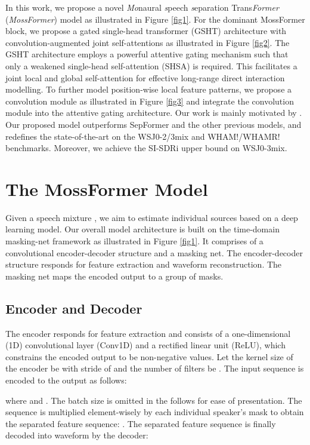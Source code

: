 \documentclass[9pt]{extarticle}
\begin{document}
In this work, we propose a novel \textit{Mo}naural \textit{s}peech \textit{s}eparation Trans\textit{Former} (\textit{MossFormer}) model as illustrated in Figure \ref{fig1}. For the dominant MossFormer block, we propose a gated single-head transformer (GSHT) architecture with convolution-augmented joint self-attentions as illustrated in Figure \ref{fig2}. The GSHT architecture employs a powerful attentive gating mechanism such that only a weakened single-head self-attention (SHSA) is required.  This facilitates a joint local and global self-attention for effective long-range direct interaction modelling. To further model position-wise local feature patterns, we propose a convolution module as illustrated in Figure \ref{fig3} and integrate the convolution module into the attentive gating architecture. Our work is mainly motivated by \cite{gulati20J, Hua2022Z}. 
Our proposed model outperforms SepFormer and the other previous models, and redefines the state-of-the-art on the WSJ0-2/3mix and WHAM!/WHAMR! benchmarks. Moreover, we achieve the SI-SDRi upper bound \cite{Lutati2022E} on WSJ0-3mix. 


\section{The MossFormer Model}
Given a speech mixture , we aim to estimate  individual sources  based on a deep learning model. Our overall model architecture is built on the time-domain masking-net framework \cite{Luo2019N} as illustrated in Figure \ref{fig1}. It comprises of a convolutional encoder-decoder structure and a masking net. The encoder-decoder structure responds for feature extraction and waveform reconstruction. The masking net maps the encoded output to a group of masks. 
\subsection{Encoder and Decoder}
The encoder responds for feature extraction and consists of a one-dimensional (1D) convolutional layer (Conv1D) and a rectified linear unit (ReLU), which constrains the encoded output to be non-negative values. 
Let the kernel size of the encoder be  with stride of  and the number of filters be . The input sequence  is encoded to the output  as follows:
     
where  and . The batch size  is omitted in the follows for ease of presentation. The sequence  is multiplied element-wisely by each individual speaker's mask to obtain the separated feature sequence: . The separated feature sequence is finally decoded into waveform by the decoder:
 
\end{document}
